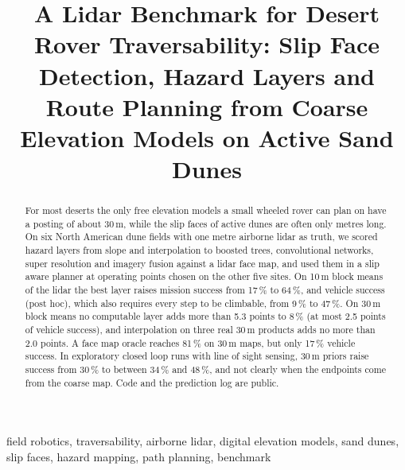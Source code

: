 \documentclass[conference]{IEEEtran}
\begin{document}
\title{A Lidar Benchmark for Desert Rover Traversability: Slip Face Detection, Hazard Layers and Route Planning from Coarse Elevation Models on Active Sand Dunes}

\author{
\and
{}
}

\IEEEaftertitletext{\vspace{-0.9\baselineskip}}
\maketitle

\begin{abstract}
For most deserts the only free elevation models a small wheeled rover can plan on have a posting of about 30\,m, while the slip faces of active dunes are often only metres long. On six North American dune fields with one metre airborne lidar as truth, we scored hazard layers from slope and interpolation to boosted trees, convolutional networks, super resolution and imagery fusion against a lidar face map, and used them in a slip aware planner at operating points chosen on the other five sites. On 10\,m block means of the lidar the best layer raises mission success from 17\,\% to 64\,\%, and vehicle success (post hoc), which also requires every step to be climbable, from 9\,\% to 47\,\%. On 30\,m block means no computable layer adds more than 5.3 points to 8\,\% (at most 2.5 points of vehicle success), and interpolation on three real 30\,m products adds no more than 2.0 points. A face map oracle reaches 81\,\% on 30\,m maps, but only 17\,\% vehicle success. In exploratory closed loop runs with line of sight sensing, 30\,m priors raise success from 30\,\% to between 34\,\% and 48\,\%, and not clearly when the endpoints come from the coarse map. Code and the prediction log are public.
\end{abstract}

\begin{IEEEkeywords}
field robotics, traversability, airborne lidar, digital elevation models, sand dunes, slip faces, hazard mapping, path planning, benchmark
\end{IEEEkeywords}
\end{document}
